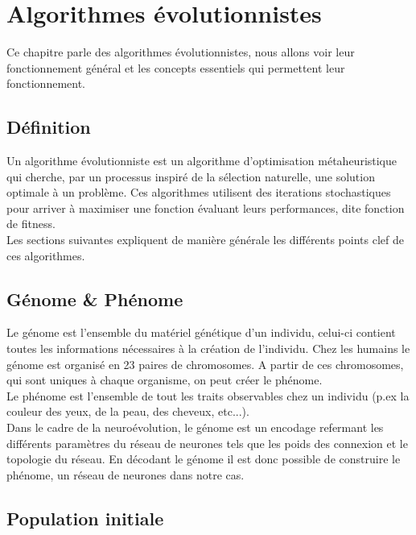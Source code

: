 \documentclass{article}
\begin{document}
\newpage
\section{Algorithmes évolutionnistes}

Ce chapitre parle des algorithmes évolutionnistes, nous allons voir leur fonctionnement général et les concepts essentiels qui permettent leur fonctionnement.

\subsection{Définition}

Un algorithme évolutionniste est un algorithme d'optimisation métaheuristique qui cherche, par un processus inspiré de la sélection naturelle, une solution optimale à un problème. Ces algorithmes utilisent des iterations stochastiques pour arriver à maximiser une fonction évaluant leurs performances, dite fonction de fitness\cite{wikiea}.\\

Les sections suivantes expliquent de manière générale les différents points clef de ces algorithmes.

\subsection{Génome \& Phénome}

Le génome est l'ensemble du matériel génétique d'un individu, celui-ci contient toutes les informations nécessaires à la création de l'individu\cite{wikigenome}. Chez les humains le génome est organisé en 23 paires de chromosomes. A partir de ces chromosomes, qui sont uniques à chaque organisme, on peut créer le phénome.\\
Le phénome est l'ensemble de tout les traits observables chez un individu (p.ex la couleur des yeux, de la peau, des cheveux, etc...)\cite{wikiphenome}.\\

Dans le cadre de la neuroévolution, le génome est un encodage refermant les différents paramètres du réseau de neurones tels que les poids des connexion et le topologie du réseau. En décodant le génome il est donc possible de construire le phénome, un réseau de neurones dans notre cas.

\subsection{Population initiale}
\end{document}
